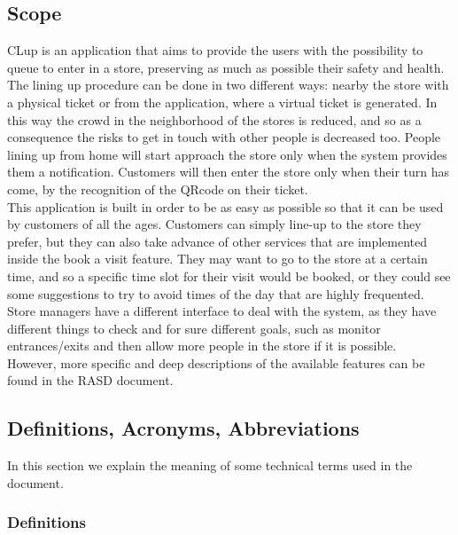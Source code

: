 \documentclass[]{article}
\begin{document}
	\bigskip
	\bigskip
	
	\subsection{Scope}
	
		\noindent
		CLup is an application that aims to provide the users with the possibility to queue to enter in a store, preserving as much as possible their safety and health. The lining up procedure can be done in two different ways: nearby the store with a physical ticket or from the application, where a virtual ticket is generated. In this way the crowd in the neighborhood of the stores is reduced, and so as a consequence the risks to get in touch with other people is decreased too. People lining up from home will start approach the store only when the system provides them a notification. Customers will then enter the store only when their turn has come, by the recognition of the QRcode on their ticket.\\
		This application is built in order to be as easy as possible so that it can be used by customers of all the ages. Customers can simply line-up to the store they prefer, but they can also take advance of other services that are implemented inside the book a visit feature. They may want to go to the store at a certain time, and so a specific time slot for their visit would be booked, or they could see some suggestions to try to avoid times of the day that are highly frequented. Store managers have a different interface to deal with the system, as they have different things to check and for sure different goals, such as monitor entrances/exits and then allow more people in the store if it is possible. \\
		However, more specific and deep descriptions of the available features can be found in the RASD document.\\
		
	\newpage
	\subsection{Definitions, Acronyms, Abbreviations}
	
		In this section we explain the meaning of some technical terms used in the document.
		
		
		\subsubsection{Definitions}
		
\end{document}
